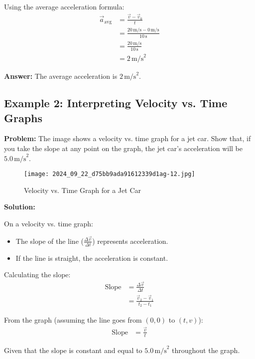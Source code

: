 \documentclass{article}
\begin{document}
Using the average acceleration formula:
\begin{align*}
\vec{a}_{\text{avg}} &= \frac{\vec{v} - \vec{v}_0}{t} \\
&= \frac{20 \, \text{m/s} - 0 \, \text{m/s}}{10 \, \text{s}} \\
&= \frac{20 \, \text{m/s}}{10 \, \text{s}} \\
&= 2 \, \text{m/s}^2
\end{align*}

\textbf{Answer:} The average acceleration is \( 2 \, \text{m/s}^2 \).
\newpage
\subsection{Example 2: Interpreting Velocity vs. Time Graphs}

\textbf{Problem:} The image shows a velocity vs. time graph for a jet car. Show that, if you take the slope at any point on the graph, the jet car's acceleration will be \( 5.0 \, \text{m/s}^2 \).


\begin{figure}[H]
    \centering
    \texttt{[image: 2024\_09\_22\_d75bb9ada91612339d1ag-12.jpg]}
\caption{Velocity vs. Time Graph for a Jet Car}
\end{figure}



\textbf{Solution:}

On a velocity vs. time graph:
\begin{itemize}
    \item The slope of the line (\( \frac{\Delta \vec{v}}{\Delta t} \)) represents acceleration.
    \item If the line is straight, the acceleration is constant.
\end{itemize}

Calculating the slope:
\begin{align*}
\text{Slope} &= \frac{\Delta \vec{v}}{\Delta t} \\
&= \frac{\vec{v}_2 - \vec{v}_1}{t_2 - t_1}
\end{align*}

From the graph (assuming the line goes from \( (0, 0) \) to \( (t, v) \)):
\begin{align*}
\text{Slope} &= \frac{\vec{v}}{t}
\end{align*}

Given that the slope is constant and equal to \( 5.0 \, \text{m/s}^2 \) throughout the graph.
\end{document}
